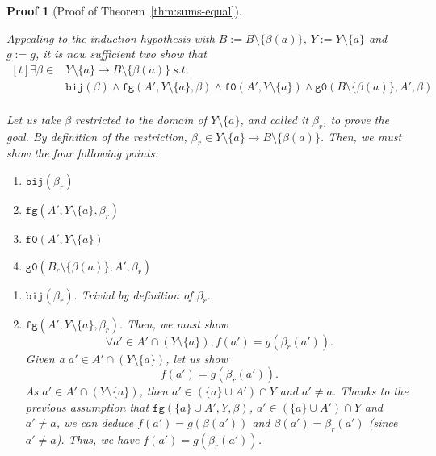 \documentclass[pdflatex,sn-mathphys]{sn-jnl}%
\theoremstyle{thmstyleone}%
\theoremstyle{thmstyletwo}%
\newtheorem*{pf}{Proof}%
\theoremstyle{thmstylethree}%
\begin{document}
\begin{appendices}
\begin{pf}[Proof of Theorem~\ref{thm:sums-equal}]
\begin{enumerate}
\begin{enumerate}
           Appealing to the induction hypothesis with
           $B:=B\setminus\{\beta(a)\}$, $Y:=Y\setminus\{a\}$ and
           $g:=g$, it is now sufficient two show that
           \begin{equation*}
             \boxed{
               \begin{aligned}[t]
                 \exists{}\beta\in{}&Y\setminus\{a\}\rightarrow{}B\setminus\{\beta(a)\}~s.t.~\\
                                    & \mathtt{bij}(\beta)\land\mathtt{fg}(A',Y\setminus\{a\},\beta)\land\mathtt{f0}(A',Y\setminus\{a\})\land\mathtt{g0}(B\setminus\{\beta(a)\},A',\beta) \\
               \end{aligned}
             }
           \end{equation*}

           Let us take $\beta$ restricted to the domain of
           $Y\setminus\{a\}$, and called it $\beta_r$, to prove the
           goal. By definition of the restriction,
           $\beta_r\in{}Y\setminus\{a\}\rightarrow{}B\setminus\{\beta(a)\}$. Then,
           we must show the four following points:
           \begin{enumerate}
           \item $\mathtt{bij}(\beta_r)$
           \item $\mathtt{fg}(A',Y\setminus\{a\},\beta_r)$
           \item $\mathtt{f0}(A',Y\setminus\{a\})$
           \item $\mathtt{g0}(B_r\setminus\{\beta(a)\},A',\beta_r)$
           \end{enumerate}

           \vspace{10pt}
           
           \begin{enumerate}
           \item $\boxed{\mathtt{bij}(\beta_r).}$ Trivial by definition of $\beta_r$.
           \item $\boxed{\mathtt{fg}(A',Y\setminus\{a\},\beta_r).}$
             Then, we must show
             \begin{equation*}
               \boxed{\forall{}a'\in{}A'\cap(Y\setminus\{a\}),f(a')=g(\beta_r(a')).}
             \end{equation*}
             Given a $a'\in{}A'\cap(Y\setminus\{a\})$, let us show
             \begin{equation*}
               \boxed{f(a')=g(\beta_r(a')).}
             \end{equation*}
             As $a'\in{}A'\cap(Y\setminus\{a\})$, then
             $a'\in{}(\{a\}\cup{}A')\cap{}Y$ and $a'\neq{}a$. Thanks to
             the previous assumption that
             $\mathtt{fg}(\{a\}\cup{}A',Y,\beta)$,
             $a'\in{}(\{a\}\cup{}A')\cap{}Y$ and $a'\neq{}a$, we can
             deduce $f(a')=g(\beta(a'))$ and $\beta(a')=\beta_r(a')$
             (since $a'\neq{}a$). Thus, we have $f(a')=g(\beta_r(a'))$.
             

\end{enumerate}
\end{enumerate}
\end{enumerate}
\end{pf}
\end{appendices}
\end{document}
